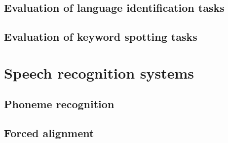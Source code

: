 \subsection{Evaluation of language identification tasks}
\subsection{Evaluation of keyword spotting tasks}

\section{Speech recognition systems}
\subsection{Phoneme recognition}
\subsection{Forced alignment}
